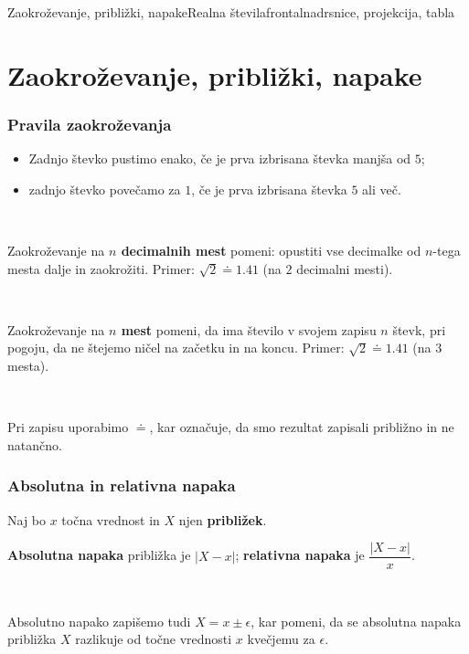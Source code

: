 \begin{priprava}{26}{}{Zaokroževanje, približki, napake}{Realna števila}{frontalna}{drsnice, projekcija, tabla}
    
    \section{Zaokroževanje, približki, napake}

    
    \subsubsection*{Pravila zaokroževanja}
        \begin{itemize}
            \item Zadnjo števko pustimo enako, če je prva izbrisana števka manjša od $5$;
            \item zadnjo števko povečamo za $1$, če je prva izbrisana števka $5$ ali več.
        \end{itemize}
    

        ~~

    
        Zaokroževanje na \textbf{$n$ decimalnih mest} pomeni: 
        opustiti vse decimalke od $n$-tega mesta dalje in zaokrožiti.
        Primer: $\sqrt{2}\doteq 1.41$ (na $2$ decimalni mesti).
    
        ~~
    
        Zaokroževanje na \textbf{$n$ mest} pomeni, 
        da ima število v svojem zapisu $n$ števk, 
        pri pogoju, da ne štejemo ničel na začetku in na koncu.
        Primer: $\sqrt{2}\doteq 1.41$ (na $3$ mesta).
    
        ~
    
        Pri zapisu uporabimo $\doteq$, kar označuje, da smo rezultat zapisali približno in ne natančno.
    




    \subsubsection*{Absolutna in relativna napaka}
        Naj bo $x$ točna vrednost in $X$ njen \textbf{približek}.

        \textbf{Absolutna napaka} približka je $\left\lvert X-x\right\rvert$; 
        \textbf{relativna napaka} je $\dfrac{\left\lvert X-x\right\rvert}{x}$.
    
        ~~
    
        Absolutno napako zapišemo tudi $X=x\pm\epsilon$, kar pomeni, da se absolutna napaka približka $X$ razlikuje od točne vrednosti $x$ kvečjemu za $\epsilon$.
    


\end{priprava}
